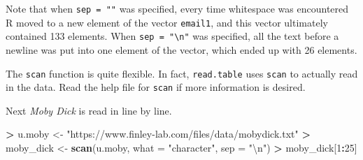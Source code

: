 \documentclass[
]{krantz}
\makeatletter
\newenvironment{Shaded}{\begin{snugshade}}{\end{snugshade}}
\newcommand{\CharTok}[1]{\textcolor[rgb]{0.5,0.5,0.5}{#1}}
\newcommand{\DataTypeTok}[1]{\textcolor[rgb]{0.27,0.27,0.27}{#1}}
\newcommand{\DecValTok}[1]{\textcolor[rgb]{0.06,0.06,0.06}{#1}}
\newcommand{\KeywordTok}[1]{\textcolor[rgb]{0.27,0.27,0.27}{\textbf{#1}}}
\newcommand{\NormalTok}[1]{#1}
\newcommand{\OperatorTok}[1]{\textcolor[rgb]{0.43,0.43,0.43}{\textbf{#1}}}
\newcommand{\StringTok}[1]{\textcolor[rgb]{0.5,0.5,0.5}{#1}}
\newenvironment{kframe}{%
\medskip{}
\setlength{\fboxsep}{.8em}
 \def\at@end@of@kframe{}%
 \ifinner\ifhmode%
  \def\at@end@of@kframe{\end{minipage}}%
  \begin{minipage}{\columnwidth}%
 \fi\fi%
 \def\FrameCommand##1{\hskip\@totalleftmargin \hskip-\fboxsep
 \colorbox{shadecolor}{##1}\hskip-\fboxsep
     \hskip-\linewidth \hskip-\@totalleftmargin \hskip\columnwidth}%
 \MakeFramed {\advance\hsize-\width
   \@totalleftmargin\z@ \linewidth\hsize
   \@setminipage}}%
 {\par\unskip\endMakeFramed%
 \at@end@of@kframe}
\renewenvironment{Shaded}{\begin{kframe}}{\end{kframe}}
\makeatother
\begin{document}
Note that when \texttt{sep\ =\ ""} was specified, every time whitespace was encountered R moved to a new element of the vector \texttt{email1}, and this vector ultimately contained 133 elements. When \texttt{sep\ =\ "\textbackslash{}n"} was specified, all the text before a newline was put into one element of the vector, which ended up with 26 elements.

The \texttt{scan} function is quite flexible. In fact, \texttt{read.table} uses \texttt{scan} to actually read in the data. Read the help file for \texttt{scan} if more information is desired.

Next \emph{Moby Dick} is read in line by line.

\begin{Shaded}
\begin{Highlighting}[]
\OperatorTok{\textgreater{}}\StringTok{ }\NormalTok{u.moby \textless{}{-}}\StringTok{ "https://www.finley{-}lab.com/files/data/mobydick.txt"}
\OperatorTok{\textgreater{}}\StringTok{ }\NormalTok{moby\_dick \textless{}{-}}\StringTok{ }\KeywordTok{scan}\NormalTok{(u.moby, }\DataTypeTok{what =} \StringTok{"character"}\NormalTok{, }\DataTypeTok{sep =} \StringTok{"}\CharTok{\textbackslash{}n}\StringTok{"}\NormalTok{)}
\OperatorTok{\textgreater{}}\StringTok{ }\NormalTok{moby\_dick[}\DecValTok{1}\OperatorTok{:}\DecValTok{25}\NormalTok{]}
\end{Highlighting}
\end{Shaded}
\end{document}

